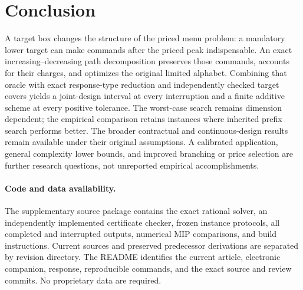 \section{Conclusion}
A target box changes the structure of the priced menu problem: a mandatory lower target can make commands after the priced peak indispensable. An exact increasing--decreasing path decomposition preserves those commands, accounts for their charges, and optimizes the original limited alphabet. Combining that oracle with exact response-type reduction and independently checked target covers yields a joint-design interval at every interruption and a finite additive scheme at every positive tolerance. The worst-case search remains dimension dependent; the empirical comparison retains instances where inherited prefix search performs better. The broader contractual and continuous-design results remain available under their original assumptions. A calibrated application, general complexity lower bounds, and improved branching or price selection are further research questions, not unreported empirical accomplishments.

\paragraph{Code and data availability.}
The supplementary source package contains the exact rational solver, an independently implemented certificate checker, frozen instance protocols, all completed and interrupted outputs, numerical MIP comparisons, and build instructions. Current sources and preserved predecessor derivations are separated by revision directory. The README identifies the current article, electronic companion, response, reproducible commands, and the exact source and review commits. No proprietary data are required.
